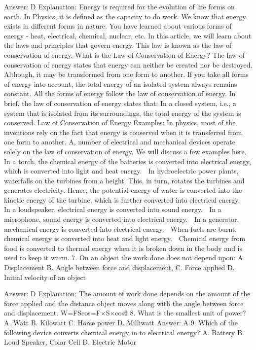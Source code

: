 Answer: D
Explanation: Energy is required for the evolution of life forms on earth. In Physics, it is defined as the capacity to do work. We know that energy exists in different forms in nature. You have learned about various forms of energy - heat, electrical, chemical, nuclear, etc. In this article, we will learn about the laws and principles that govern energy. This law is known as the law of conservation of energy. What is the Law of Conservation of Energy? The law of conservation of energy states that energy can neither be created nor be destroyed. Although, it may be transformed from one form to another. If you take all forms of energy into account, the total energy of an isolated system always remains constant. All the forms of energy follow the law of conservation of energy. In brief, the law of conservation of energy states that: In a closed system, i.e., a system that is isolated from its surroundings, the total energy of the system is conserved. Law of Conservation of Energy Examples: In physics, most of the inventions rely on the fact that energy is conserved when it is transferred from one form to another. A,  number of electrical and mechanical devices operate solely on the law of conservation of energy. We will discuss a few examples here.  In a torch, the chemical energy of the batteries is converted into electrical energy, which is converted into light and heat energy.  In hydroelectric power plants, waterfalls on the turbines from a height. This, in turn, rotates the turbines and generates electricity. Hence, the potential energy of water is converted into the kinetic energy of the turbine, which is further converted into electrical energy.  In a loudspeaker, electrical energy is converted into sound energy.  In a microphone, sound energy is converted into electrical energy.  In a generator, mechanical energy is converted into electrical energy.  When fuels are burnt, chemical energy is converted into heat and light energy.  Chemical energy from food is converted to thermal energy when it is broken down in the body and is used to keep it warm. 7. On an object the work done does not depend upon: A. Displacement B. Angle between force and displacement,  C. Force applied D. Initial velocity of an object 

Answer: D
Explanation: The amount of work done depends on the amount of the force applied and the distance object moves along with the angle between force and displacement. W=F\times S\times cos\theta=F×S×cosθ 8. What is the smallest unit of power? A. Watt B. Kilowatt C. Horse power D. Milliwatt 
Answer: A 9. Which of the following device converts chemical energy in to electrical energy? A. Battery B. Loud 
Speaker,  Colar Cell D. Electric Motor 

